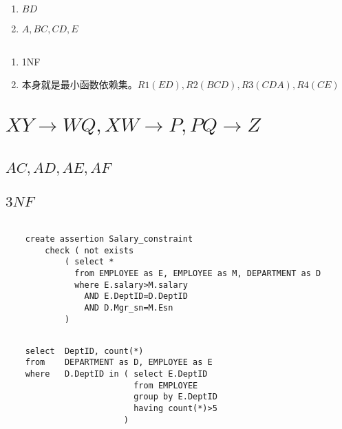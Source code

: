 \documentclass{ctexart}
\begin{document}
\subsection{}
\begin{enumerate}[label=\Alph*.]
    \item $BD$
    \item $A,BC,CD,E$
\end{enumerate}
\subsection{}
\begin{enumerate}[label=\Alph*.]
    \item 1NF
    \item 本身就是最小函数依赖集。$R1(ED),R2(BCD),R3(CDA),R4(CE)$
\end{enumerate}
\section{${XY\rightarrow WQ,XW\rightarrow P,PQ\rightarrow Z}$}
\section{}
\subsection{$AC,AD,AE,AF$}
\subsection{$3NF$}
\section{}
\subsection{}
\begin{verbatim}
    create assertion Salary_constraint
        check ( not exists
            ( select *
              from EMPLOYEE as E, EMPLOYEE as M, DEPARTMENT as D
              where E.salary>M.salary
                AND E.DeptID=D.DeptID
                AND D.Mgr_sn=M.Esn
            )
\end{verbatim}
\subsection{}
\begin{verbatim}
    select  DeptID, count(*)
    from    DEPARTMENT as D, EMPLOYEE as E
    where   D.DeptID in ( select E.DeptID
                          from EMPLOYEE
                          group by E.DeptID
                          having count(*)>5
                        )
\end{verbatim}
\end{document}
